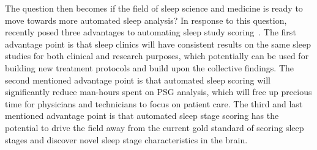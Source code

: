The question then becomes if the field of sleep science and medicine is ready to move towards more automated sleep analysis?
In response to this question, \citeauthor{Lim2020} recently posed three advantages to automating sleep study scoring~\cite{Lim2020}.
The first advantage point is that sleep clinics will have consistent results on the same sleep studies for both clinical and research purposes, which potentially can be used for building new treatment protocols and build upon the collective findings.
The second mentioned advantage point is that automated sleep scoring will significantly reduce man-hours spent on \ac{PSG} analysis, which will free up precious time for physicians and technicians to focus on patient care.
The third and last mentioned advantage point is that automated sleep stage scoring has the potential to drive the field away from the current gold standard of scoring sleep stages and discover novel sleep stage characteristics in the brain.



